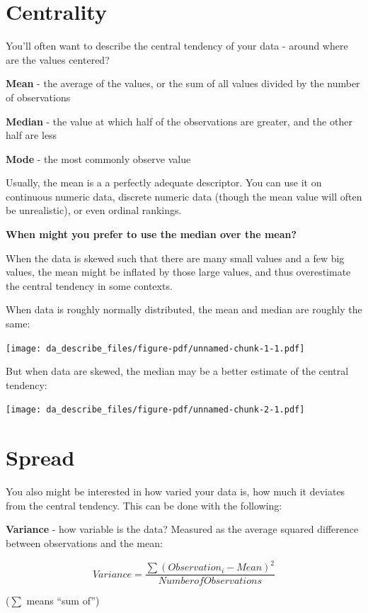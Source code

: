 \documentclass[
  letterpaper,
  DIV=11,
  numbers=noendperiod]{scrreprt}
\begin{document}
\hypertarget{centrality}{%
\section{Centrality}\label{centrality}}

You'll often want to describe the central tendency of your data - around
where are the values centered?

\textbf{Mean} - the average of the values, or the sum of all values
divided by the number of observations

\textbf{Median} - the value at which half of the observations are
greater, and the other half are less

\textbf{Mode} - the most commonly observe value

Usually, the mean is a a perfectly adequate descriptor. You can use it
on continuous numeric data, discrete numeric data (though the mean value
will often be unrealistic), or even ordinal rankings.

\textbf{When might you prefer to use the median over the mean?}

When the data is skewed such that there are many small values and a few
big values, the mean might be inflated by those large values, and thus
overestimate the central tendency in some contexts.

When data is roughly normally distributed, the mean and median are
roughly the same:

\texttt{[image: da\_describe\_files/figure-pdf/unnamed-chunk-1-1.pdf]}

But when data are skewed, the median may be a better estimate of the
central tendency:

\texttt{[image: da\_describe\_files/figure-pdf/unnamed-chunk-2-1.pdf]}

\hypertarget{spread}{%
\section{Spread}\label{spread}}

You also might be interested in how varied your data is, how much it
deviates from the central tendency. This can be done with the following:

\textbf{Variance} - how variable is the data? Measured as the average
squared difference between observations and the mean:

\[
Variance = \frac{\sum (Observation_i - Mean)^2}{Number of Observations}
\]

(\(\sum\) means ``sum of'')
\end{document}
